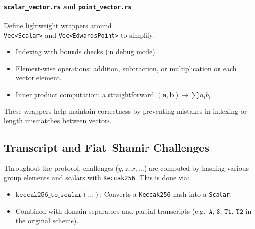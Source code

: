 \documentclass[12pt,a4paper]{article}
\begin{document}
\paragraph{\texttt{scalar\_vector.rs} and \texttt{point\_vector.rs}}
Define lightweight wrappers around \\ \texttt{Vec<Scalar>} and \texttt{Vec<EdwardsPoint>} to simplify:
\begin{itemize}
    \item Indexing with bounds checks (in debug mode). %
    \item Element-wise operations: addition, subtraction, or multiplication on each vector element. %
    \item Inner product computation: a straightforward $(\mathbf{a},\mathbf{b}) \mapsto \sum a_i b_i$. %
\end{itemize}

These wrappers help maintain correctness by preventing mistakes in indexing or length mismatches between vectors.

\subsection{Transcript and Fiat--Shamir Challenges}
Throughout the protocol, challenges ($y, z, x, \dots$) are computed by hashing various group elements and scalars with \texttt{Keccak256}.  This is done via:
\begin{itemize}
    \item $\texttt{keccak256\_to\_scalar}(...)$: Converts a \texttt{Keccak256} hash into a \texttt{Scalar}. %
    \item Combined with domain separators and partial transcripts (e.g.\ $\texttt{A}$, $\texttt{S}$, $\texttt{T1}$, $\texttt{T2}$ in the original scheme). %
\end{itemize}
\end{document}
